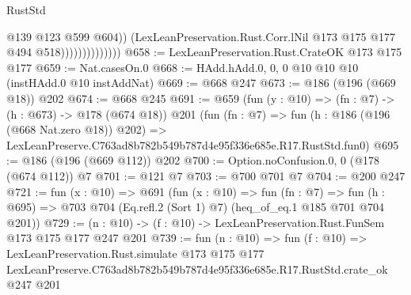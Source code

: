 \begin{lexlean}{RustStd}
\begin{coremodule}
                                  @139
                                  @123
                                  @599
                                  @604))
                              (LexLeanPreservation.Rust.Corr.lNil
                                @173
                                @175
                                @177
                                @494
                                @518))))))))))))))
@658 := LexLeanPreservation.Rust.CrateOK @173 @175 @177
@659 := Nat.casesOn.{0}
@668 := HAdd.hAdd.{0, 0, 0} @10 @10 @10 (instHAdd.{0} @10 instAddNat)
@669 := @668 @247
@673 := @186 (@196 (@669 @18)) @202
@674 := @668 @245
@691 := @659
    (fun (y : @10) => (fn : @7) -> (h : @673) -> @178 (@674 @18))
    @201
    (fun (fn : @7) =>
    fun (h : @186 (@196 (@668 Nat.zero @18)) @202) =>
    LexLeanPreserve.C763ad8b782b549b787d4e95f336e685e.R17.RustStd.fun0)
@695 := @186 (@196 (@669 @112)) @202
@700 := Option.noConfusion.{0, 0} (@178 (@674 @112)) @7
@701 := @121 @7
@703 := @700 @701 @7
@704 := @200 @247
@721 := fun (x : @10) =>
  @691
    (fun (x : @10) =>
    fun (fn : @7) =>
    fun (h : @695) => @703 @704 (Eq.refl.{2} (Sort 1) @7) (heq_of_eq.{1} @185 @701 @704 @201))
@729 := (n : @10) -> (f : @10) -> LexLeanPreservation.Rust.FunSem @173 @175 @177 @247 @201
@739 := fun (n : @10) =>
  fun (f : @10) =>
  LexLeanPreservation.Rust.simulate
    @173
    @175
    @177
    LexLeanPreserve.C763ad8b782b549b787d4e95f336e685e.R17.RustStd.crate_ok
    @247
    @201
\end{coremodule}
\end{lexlean}
